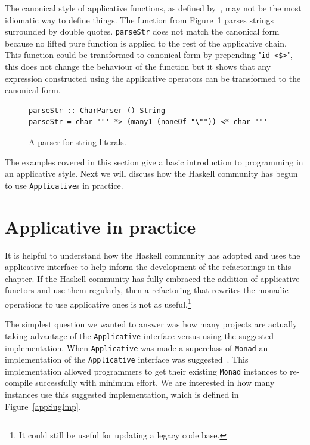 The canonical style of applicative functions, as defined by~\citep{mcbrideIdioms}, may not be the most idiomatic way to define things. The function from Figure~\ref{strParse} parses strings surrounded by double quotes. \texttt{parseStr} does not match the canonical form because no lifted pure function is applied to the rest of the applicative chain. This function could be transformed to canonical form by prepending "\texttt{id <\$>}", this does not change the behaviour of the function but it shows that any expression constructed using the applicative operators can be transformed to the canonical form.


\begin{figure}[t]
\begin{lstlisting}
parseStr :: CharParser () String 
parseStr = char '"' *> (many1 (noneOf "\"")) <* char '"'
\end{lstlisting}
\caption{A parser for string literals.}
\label{strParse}
\end{figure}


The examples covered in this section give a basic introduction to programming in an applicative style. Next we will discuss how the Haskell community has begun to use \texttt{Applicative}s in practice. 

\section{Applicative in practice}
\label{sec:appInPractice}

It is helpful to understand how the Haskell community has adopted and uses the applicative interface to help inform the development of the refactorings in this chapter. If the Haskell community has fully embraced the addition of applicative functors and use them regularly, then a refactoring that rewrites the monadic operations to use applicative ones is not as useful.\footnote{It could still be useful for updating a legacy code base.} 

The simplest question we wanted to answer was how many projects are actually taking advantage of the \texttt{Applicative} interface versus using the suggested implementation. When \texttt{Applicative} was made a superclass of \texttt{Monad} an implementation of the \texttt{Applicative} interface was suggested~\citep{applicativeProposal}. This implementation allowed programmers to get their existing \texttt{Monad} instances to re-compile successfully with minimum effort. We are interested in how many instances use this suggested implementation, which is defined in Figure~\ref{appSugImp}.

